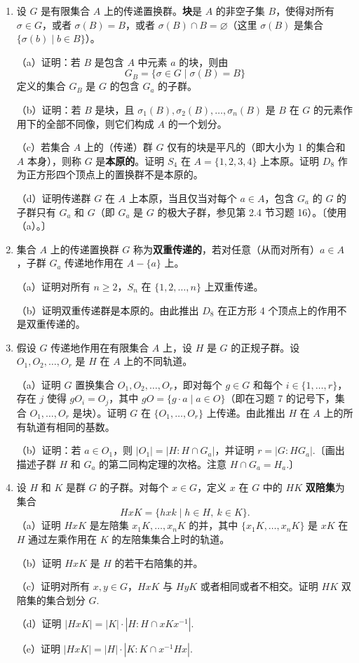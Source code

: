 \begin{enumerate}
\item 设 \(G\) 是有限集合 \(A\) 上的传递置换群。\textbf{块}是 \(A\) 的非空子集 \(B\)，使得对所有 \(\sigma \in G\)，或者 \(\sigma(B) = B\)，或者 \(\sigma(B) \cap B = \varnothing\)（这里 \(\sigma(B)\) 是集合 \(\{\sigma(b) \mid b \in B\}\)）。

（a）证明：若 \(B\) 是包含 \(A\) 中元素 \(a\) 的块，则由
\[
G_B = \{\sigma \in G \mid \sigma(B) = B\}
\]
定义的集合 \(G_B\) 是 \(G\) 的包含 \(G_a\) 的子群。

（b）证明：若 \(B\) 是块，且 \(\sigma_1(B), \sigma_2(B), \ldots, \sigma_n(B)\) 是 \(B\) 在 \(G\) 的元素作用下的全部不同像，则它们构成 \(A\) 的一个划分。

（c）若集合 \(A\) 上的（传递）群 \(G\) 仅有的块是平凡的（即大小为 1 的集合和 \(A\) 本身），则称 \(G\) 是\textbf{本原的}。证明 \(S_4\) 在 \(A = \{1, 2, 3, 4\}\) 上本原。证明 \(D_8\) 作为正方形四个顶点上的置换群不是本原的。

（d）证明传递群 \(G\) 在 \(A\) 上本原，当且仅当对每个 \(a \in A\)，包含 \(G_a\) 的 \(G\) 的子群只有 \(G_a\) 和 \(G\)（即 \(G_a\) 是 \(G\) 的极大子群，参见第 2.4 节习题 16）。〔使用（a）。〕

\item 集合 \(A\) 上的传递置换群 \(G\) 称为\textbf{双重传递的}，若对任意（从而对所有）\(a \in A\)，子群 \(G_a\) 传递地作用在 \(A - \{a\}\) 上。

（a）证明对所有 \(n \geq 2\)，\(S_n\) 在 \(\{1, 2, \ldots, n\}\) 上双重传递。

（b）证明双重传递群是本原的。由此推出 \(D_8\) 在正方形 4 个顶点上的作用不是双重传递的。

\item 假设 \(G\) 传递地作用在有限集合 \(A\) 上，设 \(H\) 是 \(G\) 的正规子群。设 \(O_1, O_2, \ldots, O_r\) 是 \(H\) 在 \(A\) 上的不同轨道。

（a）证明 \(G\) 置换集合 \(O_1, O_2, \ldots, O_r\)，即对每个 \(g \in G\) 和每个 \(i \in \{1, \ldots, r\}\)，存在 \(j\) 使得 \(gO_i = O_j\)，其中 \(gO = \{g \cdot a \mid a \in O\}\)（即在习题 7 的记号下，集合 \(O_1, \ldots, O_r\) 是块）。证明 \(G\) 在 \(\{O_1, \ldots, O_r\}\) 上传递。由此推出 \(H\) 在 \(A\) 上的所有轨道有相同的基数。

（b）证明：若 \(a \in O_1\)，则 \(|O_1| = |H : H \cap G_a|\)，并证明 \(r = |G : HG_a|\).〔画出描述子群 \(H\) 和 \(G_a\) 的第二同构定理的次格。注意 \(H \cap G_a = H_a\).〕

\item 设 \(H\) 和 \(K\) 是群 \(G\) 的子群。对每个 \(x \in G\)，定义 \(x\) 在 \(G\) 中的 \(HK\) \textbf{双陪集}为集合
\[
HxK = \{hxk \mid h \in H,\ k \in K\}.
\]
（a）证明 \(HxK\) 是左陪集 \(x_1K, \ldots, x_nK\) 的并，其中 \(\{x_1K, \ldots, x_nK\}\) 是 \(xK\) 在 \(H\) 通过左乘作用在 \(K\) 的左陪集集合上时的轨道。

（b）证明 \(HxK\) 是 \(H\) 的若干右陪集的并。

（c）证明对所有 \(x, y \in G\)，\(HxK\) 与 \(HyK\) 或者相同或者不相交。证明 \(HK\) 双陪集的集合划分 \(G\).

（d）证明 \(|HxK| = |K| \cdot |H : H \cap xKx^{-1}|\).

（e）证明 \(|HxK| = |H| \cdot |K : K \cap x^{-1}Hx|\).
\end{enumerate}

